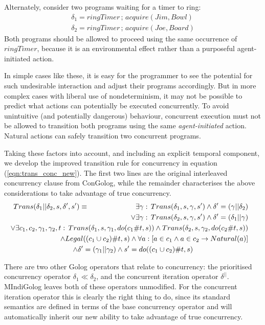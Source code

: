 Alternately, consider two programs waiting for a timer to ring:\begin{gather*}
\delta_{1}=ringTimer\,;\, acquire(Jim,Bowl)\\
\delta_{2}=ringTimer\,;\, acquire(Joe,Board)\end{gather*}
 Both programs should be allowed to proceed using the same occurrence
of $ringTimer$, because it is an environmental effect rather than
a purposeful agent-initiated action.

In simple cases like these, it is easy for the programmer to see the
potential for such undesirable interaction and adjust their programs
accordingly. But in more complex cases with liberal use of nondeterminism,
it may not be possible to predict what actions can potentially be
executed concurrently. To avoid unintuitive (and potentially dangerous)
behaviour, concurrent execution must not be allowed to transition
both programs using the same \emph{agent-initiated} action. Natural
actions can safely transition two concurrent programs.

Taking these factors into account, and including an explicit temporal
component, we develop the improved transition rule for concurrency
in equation (\ref{eqn:trans_conc_new}). The first two lines are the
original interleaved concurrency clause from ConGolog, while the remainder
characterises the above considerations to take advantage of true concurrency.\begin{multline}
Trans(\delta_{1}||\delta_{2},s,\delta',s')\equiv\,\,\,\,\,\,\,\,\,\,\,\,\,\,\,\,\,\,\,\,\,\,\,\,\,\,\,\,\,\,\,\,\,\,\,\,\,\,\,\shoveright{\exists\gamma:\, Trans(\delta_{1},s,\gamma,s')\wedge\delta'=(\gamma||\delta_{2})}\\
\shoveright{\vee\exists\gamma:\, Trans(\delta_{2},s,\gamma,s')\wedge\delta'=(\delta_{1}||\gamma)}\\
\shoveright{\vee\exists c_{1},c_{2},\gamma_{1},\gamma_{2},t:\, Trans(\delta_{1},s,\gamma_{1},do(c_{1}\#t,s))\wedge Trans(\delta_{2},s,\gamma_{2},do(c_{2}\#t,s))}\\
\shoveright{\wedge Legal((c_{1}\cup c_{2})\#t,s)\wedge\forall a:\left[a\in c_{1}\wedge a\in c_{2}\rightarrow Natural(a)\right]}\\
\wedge\delta'=(\gamma_{1}||\gamma_{2})\wedge s'=do((c_{1}\cup c_{2})\#t,s)\label{eqn:trans_conc_new}\end{multline}


\newpage{}There are two other Golog operators that relate to concurrency:
the prioritised concurrency operator $\delta_{1}\ll\delta_{2}$, and
the concurrent iteration operator $\delta^{||}$. MIndiGolog leaves
both of these operators unmodified. For the concurrent iteration operator
this is clearly the right thing to do, since its standard semantics
are defined in terms of the base concurrency operator and will automatically
inherit our new ability to take advantage of true concurrency.


